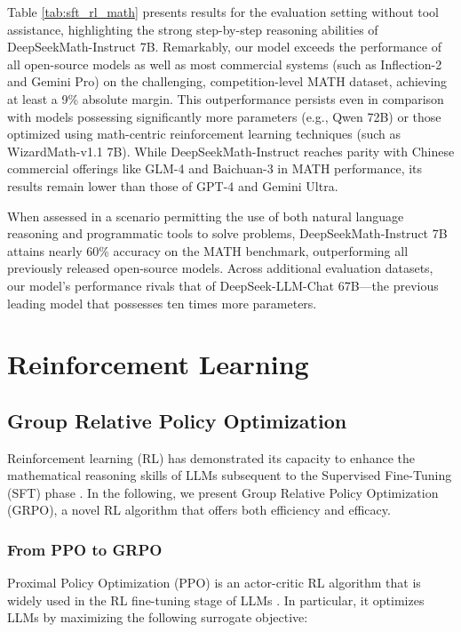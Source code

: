 \begin{itemize}[topsep=0pt]
\begin{itemize}[topsep=0pt]
Table \ref{tab:sft_rl_math} presents results for the evaluation setting without tool assistance, highlighting the strong step-by-step reasoning abilities of DeepSeekMath-Instruct 7B. Remarkably, our model exceeds the performance of all open-source models as well as most commercial systems (such as Inflection-2 and Gemini Pro) on the challenging, competition-level MATH dataset, achieving at least a 9\% absolute margin. This outperformance persists even in comparison with models possessing significantly more parameters (e.g., Qwen 72B) or those optimized using math-centric reinforcement learning techniques (such as WizardMath-v1.1 7B). While DeepSeekMath-Instruct reaches parity with Chinese commercial offerings like GLM-4 and Baichuan-3 in MATH performance, its results remain lower than those of GPT-4 and Gemini Ultra.

When assessed in a scenario permitting the use of both natural language reasoning and programmatic tools to solve problems, DeepSeekMath-Instruct 7B attains nearly 60\% accuracy on the MATH benchmark, outperforming all previously released open-source models. Across additional evaluation datasets, our model's performance rivals that of DeepSeek-LLM-Chat 67B—the previous leading model that possesses ten times more parameters.  
\section{Reinforcement Learning}

\subsection{Group Relative Policy Optimization} Reinforcement learning (RL) has demonstrated its capacity to enhance the mathematical reasoning skills of LLMs subsequent to the Supervised Fine-Tuning (SFT) phase \citep{wang2023math,wizardmath}. In the following, we present Group Relative Policy Optimization (GRPO), a novel RL algorithm that offers both efficiency and efficacy.

\subsubsection{From PPO to GRPO} Proximal Policy Optimization (PPO) \citep{schulman2017proximal} is an actor-critic RL algorithm that is widely used in the RL fine-tuning stage of LLMs \citep{ouyang2022training}. In particular, it optimizes LLMs by maximizing the following surrogate objective:


\end{itemize}
\end{itemize}
